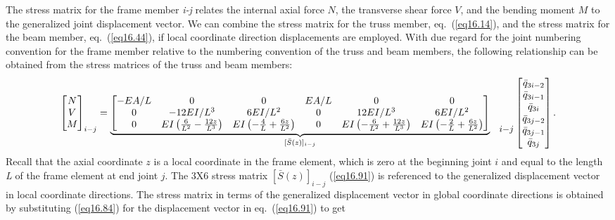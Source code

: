 \documentclass{AeroStructure-ERJohnson}
\begin{document}
The stress matrix for the frame member \textit{i-j} relates the internal axial force $N$, the transverse shear force $V$, and the bending moment $M$ to the generalized joint displacement vector. We can combine the stress matrix for the truss member, eq.~(\ref{eq16.14}), and the stress matrix for the beam member, eq.~(\ref{eq16.44}), if local coordinate direction displacements are employed. With due regard for the joint numbering convention for the frame member relative to the numbering convention of the truss and beam members, the following relationship can be obtained from the stress matrices of the truss and beam members:
\begin{align}\label{eq16.91}
\left[\begin{array}{@{}c@{}}N \\V \\M\end{array}\right]_{i-j}={\underbrace{\left[\begin{array}{@{}cccccc@{}}-E A / L & 0 & 0 & E A / L & 0 & 0 \\0 & -12 E I / L^{3} & 6 E I / L^{2} & 0 & 12 E I / L^{3} & 6 E I / L^{2} \\0 & E I\left(\frac{6}{L^{2}}-\frac{12 z}{L^{3}}\right) & E I\left(-\frac{4}{L}+\frac{6 z}{L^{2}}\right) & 0 & E I\left(-\frac{6}{L^{2}}+\frac{12 z}{L^{3}}\right) & E I\left(-\frac{2}{L}+\frac{6 z}{L^{2}}\right)\end{array}\right]}_{[\bar{S}(z)]_{i-j}}}_{\raisebox{1.4pc}{\small $i{-}j$}}\left[\begin{array}{@{}c@{}}\bar{q}_{3 i-2} \\\bar{q}_{3 i-1} \\\bar{q}_{3 i} \\\bar{q}_{3 j-2} \\\bar{q}_{3 j-1} \\\bar{q}_{3 j}\end{array}\right].
\end{align}
Recall that the axial coordinate $z$ is a local coordinate in the frame element, which is zero at the beginning joint $i$ and equal to the length \textit{L} of the frame element at end joint $j$. The 3X6 stress matrix $[\bar{S}(z)]_{i-j}$ (\ref{eq16.91}) is referenced to the generalized displacement vector in local coordinate directions. The stress matrix in terms of the generalized displacement vector in global coordinate directions is obtained by substituting (\ref{eq16.84}) for the displacement vector in eq.~(\ref{eq16.91}) to get
\end{document}
